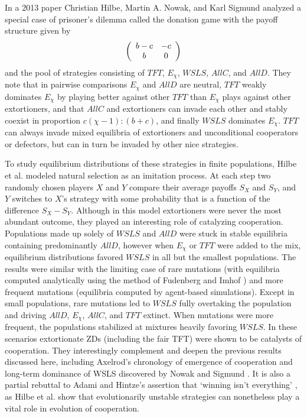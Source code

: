 In a 2013 paper Christian Hilbe, Martin A. Nowak, and Karl Sigmund analyzed a special case of prisoner's dilemma called the donation game with the payoff structure given by
\[
\left(
\begin{array}{c c}
b-c & -c\\
b & 0
\end{array}
\right)
\]
and the pool of strategies consisting of $TFT$, $E_\chi$, $WSLS$, $AllC$, and $AllD$. They note that in pairwise comparisons $E_\chi$ and $AllD$ are neutral, $TFT$ weakly dominates $E_\chi$ by playing better against other $TFT$ than $E_\chi$ plays against other extortioners, and that $AllC$ and extortioners can invade each other and stably coexist in proportion $c(\chi-1):(b+c)$, and finally $WSLS$ dominates $E_\chi$. $TFT$ can always invade mixed equilibria of extortioners and unconditional cooperators or defectors, but can in turn be invaded by other nice strategies.

To study equilibrium distributions of these strategies in finite populations, Hilbe et al. modeled natural selection as an imitation process. At each step two randomly chosen players $X$ and $Y$ compare their average payoffs $S_X$ and $S_Y$, and $Y$ switches to $X$'s strategy with some probability that is a function of the difference $S_X - S_Y$. Although in this model extortioners were never the most abundant outcome, they played an interesting role of catalyzing cooperation. Populations made up solely of $WSLS$ and $AllD$ were stuck in stable equilibria containing predominantly $AllD$, however when $E_\chi$ or $TFT$ were added to the mix, equilibrium distributions favored $WSLS$ in all but the smallest populations. The results were similar with the limiting case of rare mutations (with equilibria computed analytically using the method of Fudenberg and Imhof \cite{Fudenberg_2006}) and more frequent mutations (equilibria computed by agent-based simulations). Except in small populations, rare mutations led to $WSLS$ fully overtaking the population and driving $AllD$, $E_\chi$, $AllC$, and $TFT$ extinct. When mutations were more frequent, the populations stabilized at mixtures heavily favoring $WSLS$. In these scenarios extortionate ZDs (including the fair TFT) were shown to be catalysts of cooperation. They interestingly complement and deepen the previous results discussed here, including Axelrod's chronology of emergence of cooperation \cite[p.55]{axelrod1984evolution} and long-term dominance of WSLS discovered by Nowak and Sigmund \cite{Nowak1993}. It is also a partial rebuttal to Adami and Hintze's assertion that `winning isn't everything' \cite{Adami_Hintze_2014}, as Hilbe et al. show that evolutionarily unstable strategies can nonetheless play a vital role in evolution of cooperation.

